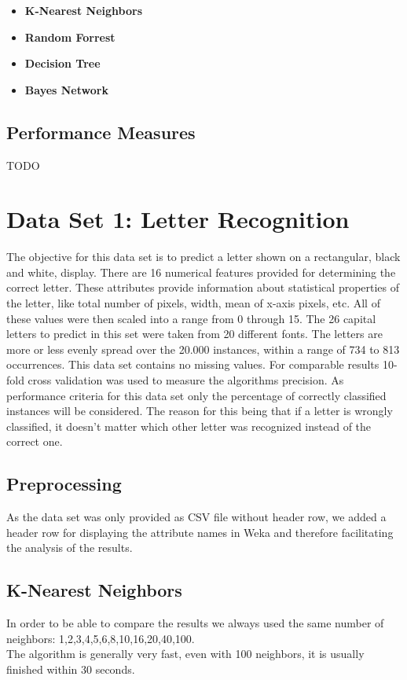 \documentclass{article}
\begin{document}
\begin{itemize}
\item \textbf{K-Nearest Neighbors}
\item \textbf{Random Forrest}
\item \textbf{Decision Tree}
\item \textbf{Bayes Network}
\end{itemize}


\subsection{Performance Measures}
TODO\\

\section{Data Set 1: Letter Recognition}
The objective for this data set is to predict a letter shown on a rectangular, black and white, display. There are 16 numerical features  provided for determining the correct letter. These attributes provide information about statistical properties of the letter, like total number of pixels, width, mean of x-axis pixels, etc.
All of these values were then scaled into a range from 0 through 15. The 26 capital letters to predict in this set were taken from 20 different fonts. The letters are more or less evenly spread over the 20.000 instances, within a range of 734 to 813 occurrences. This data set contains no missing values. For comparable results 10-fold cross validation was used to measure the algorithms precision.
As performance criteria for this data set only the percentage of correctly classified instances will be considered. The reason for this being that if a letter is wrongly classified, it doesn't matter which other letter was recognized instead of the correct one. 
\\
\subsection{Preprocessing}
As the data set was only provided as CSV file without header row, we added a header row for displaying the attribute names in Weka and therefore facilitating the analysis of the results. 
\\
\subsection{K-Nearest Neighbors}
In order to be able to compare the results we always used the same number of neighbors: 1,2,3,4,5,6,8,10,16,20,40,100.\\
The algorithm is generally very fast, even with 100 neighbors, it is usually finished within 30 seconds. 
\end{document}
